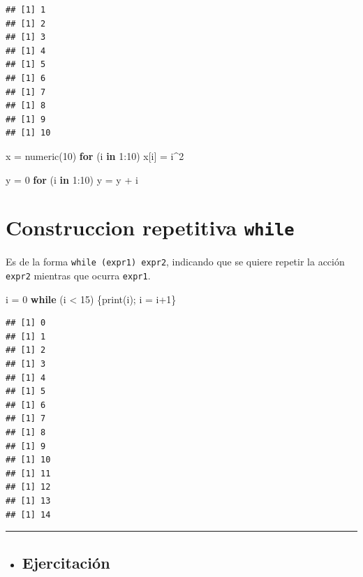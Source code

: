 \documentclass[
]{book}
\newenvironment{Shaded}{\begin{snugshade}}{\end{snugshade}}
\newcommand{\ControlFlowTok}[1]{\textcolor[rgb]{0.13,0.29,0.53}{\textbf{#1}}}
\newcommand{\DecValTok}[1]{\textcolor[rgb]{0.00,0.00,0.81}{#1}}
\newcommand{\FunctionTok}[1]{\textcolor[rgb]{0.00,0.00,0.00}{#1}}
\newcommand{\NormalTok}[1]{#1}
\newcommand{\OtherTok}[1]{\textcolor[rgb]{0.56,0.35,0.01}{#1}}
\newcommand{\SpecialCharTok}[1]{\textcolor[rgb]{0.00,0.00,0.00}{#1}}
\newenvironment{rmdblock}[1]
{\begin{shaded*}
		\begin{itemize}
			\renewcommand{\labelitemi}{
				\raisebox{-.7\height}[0pt][0pt]{
					{\setkeys{Gin}{width=3em,keepaspectratio}\texttt{[image: images/\#1]}}
				}
			}
			\item
		}
		{
		\end{itemize}
	\end{shaded*}
}
\newenvironment{rmdtip}
{\begin{rmdblock}{tip}}
	{\end{rmdblock}}
\begin{document}
\begin{verbatim}
## [1] 1
## [1] 2
## [1] 3
## [1] 4
## [1] 5
## [1] 6
## [1] 7
## [1] 8
## [1] 9
## [1] 10
\end{verbatim}

\begin{Shaded}
\begin{Highlighting}[]
\NormalTok{x }\OtherTok{=} \FunctionTok{numeric}\NormalTok{(}\DecValTok{10}\NormalTok{)}
\ControlFlowTok{for}\NormalTok{ (i }\ControlFlowTok{in} \DecValTok{1}\SpecialCharTok{:}\DecValTok{10}\NormalTok{) x[i] }\OtherTok{=}\NormalTok{ i}\SpecialCharTok{\^{}}\DecValTok{2}

\NormalTok{y }\OtherTok{=} \DecValTok{0}
\ControlFlowTok{for}\NormalTok{ (i }\ControlFlowTok{in} \DecValTok{1}\SpecialCharTok{:}\DecValTok{10}\NormalTok{) y }\OtherTok{=}\NormalTok{ y }\SpecialCharTok{+}\NormalTok{ i}
\end{Highlighting}
\end{Shaded}

\hypertarget{construccion-repetitiva-while}{%
\section{\texorpdfstring{Construccion repetitiva \texttt{while}}{Construccion repetitiva while}}\label{construccion-repetitiva-while}}

Es de la forma \texttt{while\ (expr1)\ expr2}, indicando que se quiere repetir la acción \texttt{expr2} mientras que ocurra \texttt{expr1}.

\begin{Shaded}
\begin{Highlighting}[]
\NormalTok{i }\OtherTok{=} \DecValTok{0}
\ControlFlowTok{while}\NormalTok{ (i }\SpecialCharTok{\textless{}} \DecValTok{15}\NormalTok{) \{}\FunctionTok{print}\NormalTok{(i); i }\OtherTok{=}\NormalTok{ i}\SpecialCharTok{+}\DecValTok{1}\NormalTok{\}}
\end{Highlighting}
\end{Shaded}

\begin{verbatim}
## [1] 0
## [1] 1
## [1] 2
## [1] 3
## [1] 4
## [1] 5
## [1] 6
## [1] 7
## [1] 8
## [1] 9
## [1] 10
## [1] 11
## [1] 12
## [1] 13
## [1] 14
\end{verbatim}

\begin{center}\rule{0.5\linewidth}{0.5pt}\end{center}

\begin{rmdtip}
\hypertarget{ejercitaciuxf3n}{%
\subsection{Ejercitación}\label{ejercitaciuxf3n}}
\end{rmdtip}
\end{document}
